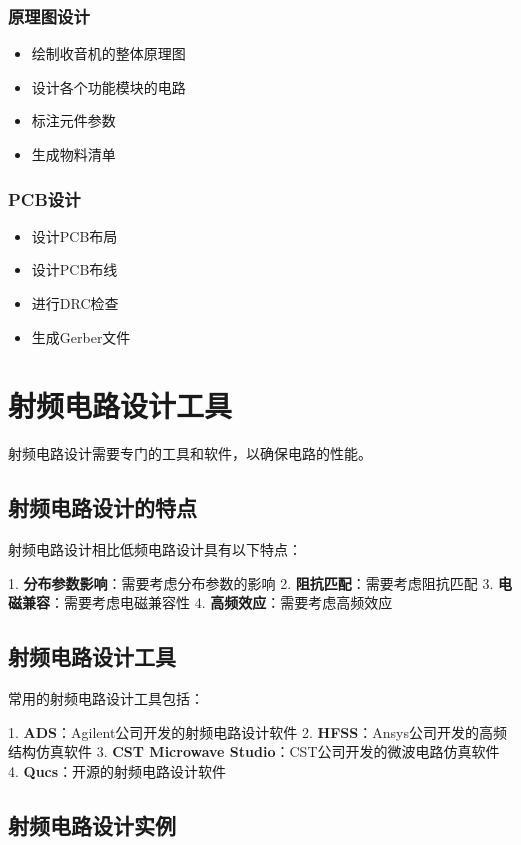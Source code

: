 \documentclass[12pt,UTF8]{ctexbook}
\begin{document}
\subsection{原理图设计}\begin{itemize}
  \item 绘制收音机的整体原理图
  \item 设计各个功能模块的电路
  \item 标注元件参数
  \item 生成物料清单\end{itemize}

\subsection{PCB设计}\begin{itemize}
  \item 设计PCB布局
  \item 设计PCB布线
  \item 进行DRC检查
  \item 生成Gerber文件\end{itemize}

\chapter{射频电路设计工具}

射频电路设计需要专门的工具和软件，以确保电路的性能。

\section{射频电路设计的特点}

射频电路设计相比低频电路设计具有以下特点：

1. \textbf{分布参数影响}：需要考虑分布参数的影响
2. \textbf{阻抗匹配}：需要考虑阻抗匹配
3. \textbf{电磁兼容}：需要考虑电磁兼容性
4. \textbf{高频效应}：需要考虑高频效应

\section{射频电路设计工具}

常用的射频电路设计工具包括：

1. \textbf{ADS}：Agilent公司开发的射频电路设计软件
2. \textbf{HFSS}：Ansys公司开发的高频结构仿真软件
3. \textbf{CST Microwave Studio}：CST公司开发的微波电路仿真软件
4. \textbf{Qucs}：开源的射频电路设计软件

\section{射频电路设计实例}
\end{document}
